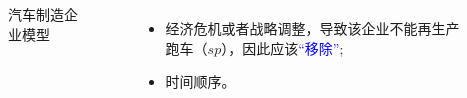\documentclass[aspectratio=1610, 9pt, CJK]{beamer}
\begin{document}
\begin{frame}
\begin{example}[汽车制造企业模型]
\begin{columns}
\begin{figure}
		\caption{汽车制造企业模型}\label{BVM}
	\end{figure} 
			\pause
			\begin{itemize} 
				\item 经济危机或者战略调整，导致该企业不能再生产跑车（$sp$），因此应该\textcolor{blue}{“移除”};
				\item 时间顺序。
			\end{itemize} 
		\end{columns} 
	\end{example}
\end{frame}
	
\end{document}
